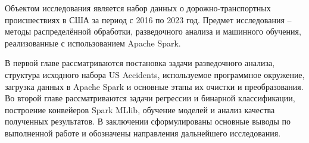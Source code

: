 Объектом исследования является набор данных о дорожно-транспортных происшествиях в США за период с 2016 по 2023 год. Предмет исследования -- методы распределённой обработки, разведочного анализа и машинного обучения, реализованные с использованием Apache Spark.

В первой главе рассматриваются постановка задачи разведочного анализа, структура исходного набора US Accidents, используемое программное окружение, загрузка данных в Apache Spark и основные этапы их очистки и преобразования. Во второй главе рассматриваются задачи регрессии и бинарной классификации, построение конвейеров Spark MLlib, обучение моделей и анализ качества полученных результатов. В заключении сформулированы основные выводы по выполненной работе и обозначены направления дальнейшего исследования.